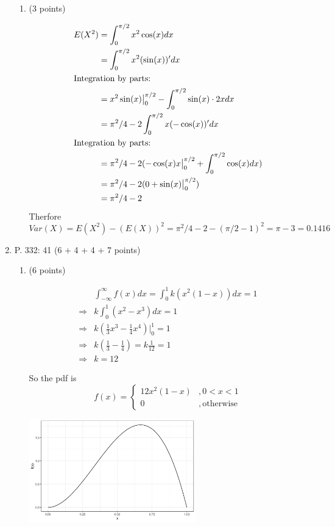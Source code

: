 \documentclass{article}\usepackage[]{graphicx}\usepackage[]{color}
\newenvironment{knitrout}{}{} %
\begin{document}
\begin{enumerate}
\begin{enumerate}
	\item (3 points)
	
	\begin{align*}
	E(X^2) &= \int_{0}^{\pi/2} x^2 \cos (x) dx \\
	& = \int_{0}^{\pi/2} x^2 (\sin(x))'dx\\
	\intertext{Integration by parts:}
	& = x^2 \sin(x)\big|_{0}^{\pi/2} - \int_{0}^{\pi/2} \sin(x) \cdot 2x dx\\
	& = \pi^2/4 - 2 \int_{0}^{\pi/2} x (-\cos(x))' dx\\
	\intertext{Integration by parts:}
	& = \pi^2/4 - 2(-\cos(x) x\big|_{0}^{\pi/2} + \int_{0}^{\pi/2} \cos(x) dx)\\
	& = \pi^2/4 - 2(0 + \sin(x)\big|_0^{\pi/2})\\
	& = \pi^2/4 - 2
	\end{align*}
	Therfore
	\[Var(X) = E(X^2) - (E(X))^2 = \pi^2/4 - 2 - (\pi/2 - 1)^2 = \pi - 3 = 0.1416\]
	\end{enumerate}
	
	\clearpage
	\item P. 332: 41 (6 + 4 + 4 + 7 points)
	\begin{enumerate}
	\item (6 points)
	
	\begin{align*}
	& \int_{-\infty}^\infty f(x) dx = \int_{0}^1 k(x^2(1 - x)) dx = 1\\
	\Rightarrow & k \int_{0}^1 (x^2 - x^3) dx = 1\\
	\Rightarrow & k (\frac{1}{3}x^3 - \frac{1}{4} x^4 )\big|_{0}^1 = 1\\
	\Rightarrow & k (\frac{1}{3} - \frac{1}{4}) = k \frac{1}{12} = 1\\
	\Rightarrow & k = 12
	\end{align*}
	
	
	So the pdf is
	\[f(x) = \begin{cases}
	12x^2(1 - x) & , 0 < x < 1\\
	0 &, \mathrm{otherwise}
	\end{cases}\]
	
\begin{knitrout}
\color{fgcolor}

{\centering \includegraphics[width=0.6\textwidth]{figure/unnamed-chunk-2-1} 

}
\end{knitrout}
\end{enumerate}
\end{enumerate}
\end{document}

